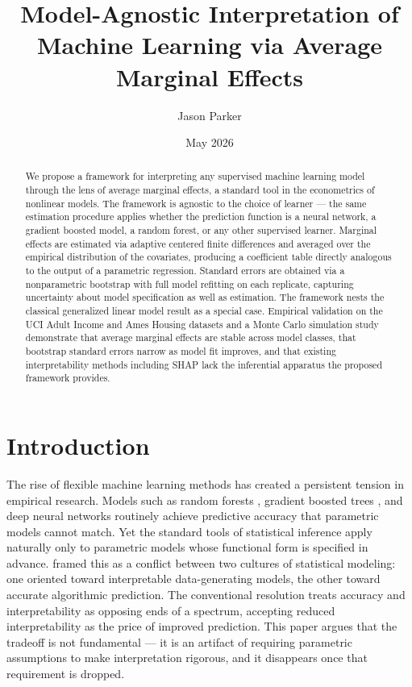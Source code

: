 \documentclass[conference]{IEEEtran}
\begin{document}
	
	\title{Model-Agnostic Interpretation of Machine Learning via Average Marginal Effects}
	\author{Jason Parker}
	\date{May 2026}
	
	\maketitle
	
	\begin{abstract}
		\noindent We propose a framework for interpreting any supervised machine learning model through the lens of average marginal effects, a standard tool in the econometrics of nonlinear models. The framework is agnostic to the choice of learner --- the same estimation procedure applies whether the prediction function is a neural network, a gradient boosted model, a random forest, or any other supervised learner. Marginal effects are estimated via adaptive centered finite differences and averaged over the empirical distribution of the covariates, producing a coefficient table directly analogous to the output of a parametric regression. Standard errors are obtained via a nonparametric bootstrap with full model refitting on each replicate, capturing uncertainty about model specification as well as estimation. The framework nests the classical generalized linear model result as a special case. Empirical validation on the UCI Adult Income and Ames Housing datasets and a Monte Carlo simulation study demonstrate that average marginal effects are stable across model classes, that bootstrap standard errors narrow as model fit improves, and that existing interpretability methods including SHAP lack the inferential apparatus the proposed framework provides.
	\end{abstract}
	
	\section{Introduction}
	
	The rise of flexible machine learning methods has created a persistent tension in empirical research. Models such as random forests \cite{breiman2001rf}, gradient boosted trees \cite{chen2016xgboost}, and deep neural networks \cite{hastie2009esl} routinely achieve predictive accuracy that parametric models cannot match. Yet the standard tools of statistical inference apply naturally only to parametric models whose functional form is specified in advance. \cite{breiman2001cultures} framed this as a conflict between two cultures of statistical modeling: one oriented toward interpretable data-generating models, the other toward accurate algorithmic prediction. The conventional resolution treats accuracy and interpretability as opposing ends of a spectrum, accepting reduced interpretability as the price of improved prediction. This paper argues that the tradeoff is not fundamental --- it is an artifact of requiring parametric assumptions to make interpretation rigorous, and it disappears once that requirement is dropped.
	
\end{document}
